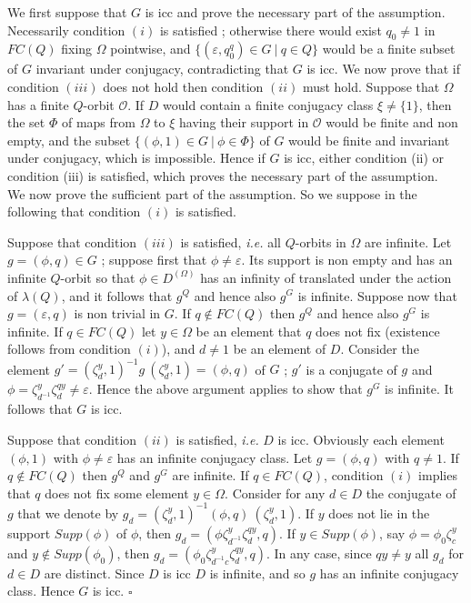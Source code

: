 \documentclass[12pt,oneside]{amsart}
\def\e{\varepsilon}
\def\f{\phi}
\def\cal{\mathcal}
\begin{document}
 We first suppose that $G$ is icc and prove the necessary part of the assumption.
 Necessarily condition $(i)$ is satisfied ; otherwise there would exist $q_0\not=1$ in
$FC(Q)$ fixing $\Omega$ pointwise, and $\{(\e,q_0^q)\in G\ |\ q\in
Q\}$ would be a finite subset of $G$ invariant under conjugacy,
contradicting that $G$ is icc. We now prove that if condition
$(iii)$ does not hold then condition $(ii)$ must hold.
%
Suppose  that  $\Omega$ has a finite $Q$-orbit $\cal O$. If $D$
would contain a finite conjugacy class $\xi\not=\{1\}$, then the
set $\Phi$ of maps from $\Omega$ to $\xi$ having their support in
$\cal O$ would be finite and non empty, and the subset
$\{(\f,1)\in G\ |\ \f\in\Phi\}$ of $G$ would be finite and
invariant under conjugacy, which is impossible. Hence if $G$ is
icc, either condition (ii) or condition (iii) is satisfied, which
proves the necessary part of the assumption.\smallskip\\
\indent We now prove the sufficient part of the assumption. So we
suppose in the following that condition $(i)$ is satisfied.

Suppose that condition $(iii)$ is satisfied, \emph{i.e.} all
$Q$-orbits in $\Omega$ are infinite. Let $g=(\f,q)\in G$ ; suppose
first that $\f\not=\e$. Its support is non empty and has an
infinite $Q$-orbit so that $\f\in D^{(\Omega)}$ has an infinity of
translated under the action of $\lambda(Q)$, and it follows that
$g^Q$ and hence also $g^G$ is infinite. Suppose now that
$g=(\e,q)$ is non trivial in $G$. If $q\not\in FC(Q)$ then $g^Q$
and hence also $g^G$ is infinite. If $q\in FC(Q)$ let $y\in\Omega$
be an element that $q$ does not fix (existence follows from
condition $(i)$),  and $d\not=1$ be an element of $D$.
Consider the element $g'=(\zeta_d^y,1)^{-1}g\
(\zeta_d^y,1)=(\phi,q)$ of $G$ ; $g'$ is a conjugate of $g$ and
$\phi=\zeta_{d^{-1}}^y\zeta_d^{qy}\not=\e$. Hence the above
argument applies to show that $g^G$ is infinite. It follows that
$G$ is icc.

Suppose that condition $(ii)$ is satisfied, \emph{i.e.} $D$ is
icc. Obviously each element $(\f,1)$ with $\f\not=\e$ has an
infinite conjugacy class. Let $g=(\f,q)$ with $q\not=1$. If
$q\not\in FC(Q)$ then $g^Q$ and $g^G$ are infinite. If $q\in
FC(Q)$, condition $(i)$ implies that $q$ does not fix some element
$y\in\Omega$.
%
Consider for any $d\in D$ the conjugate of $g$ that we denote by
$g_d=(\zeta_d^y,1)^{-1}(\f,q)\ (\zeta_d^y,1)$. If $y$ does not lie
in the support $Supp(\f)$ of $\f$, then
$g_d=(\f\zeta_{d^{-1}}^y\zeta_d^{qy},q)$. If $y\in Supp(\f)$, say
$\f=\f_0\zeta_c^y$ and $y\not\in Supp(\f_0)$, then
$g_d=(\f_0\zeta_{d^{-1}c}^y\zeta_d^{qy},q)$. In any case, since
$qy\not= y$ all $g_d$ for $d\in D$ are distinct. Since $D$ is icc
$D$ is infinite, and so $g$ has an infinite conjugacy class. Hence
$G$ is icc.
 \hfill$\square$
\end{document}
